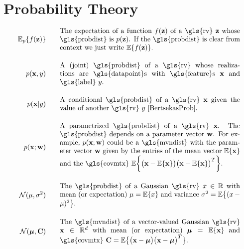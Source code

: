 \section*{Probability Theory} 
\begin{align}
	\expect_{p} \{ f(\datapoint) \}  \quad\quad & \parbox{.75\textwidth}{The expectation of a function $f(\datapoint)$ of a \gls{rv} 
		$\datapoint$ whose \gls{probdist} is $\prob{\datapoint}$. If the \gls{probdist} is clear from context 
		we just write $\expect \{ f(\datapoint) \}$. }    \nonumber \\[4mm]             
	\prob{\featurevec,\truelabel} \quad\quad & \parbox{.75\textwidth}{A (joint) \gls{probdist} of a \gls{rv} 
		whose realizations are \gls{datapoint}s with \gls{feature}s $\featurevec$ and \gls{label} $\truelabel$.} \nonumber            \\[4mm]             
	\prob{\featurevec|\truelabel} \quad\quad & \parbox{.75\textwidth}{A conditional \gls{probdist} of a \gls{rv} 
		$\featurevec$ given the value of another \gls{rv} $\truelabel$ \cite[Sec.\ 3.5]{BertsekasProb}. } \nonumber        \\[4mm]             
	\prob{\featurevec;\weights} \quad\quad & \parbox{.75\textwidth}{A parametrized \gls{probdist} of a \gls{rv} $\featurevec$. 
		The \gls{probdist} depends on a parameter vector $\weights$. For example, $\prob{\featurevec;\weights}$ could be a 
		\gls{mvndist} with the parameter vector $\weights$ given by the entries of the mean vector $\expect \{ \featurevec \}$ 
		and the \gls{covmtx} $\expect \bigg \{ \big( \featurevec - \expect \{ \featurevec \}\big) \big( \featurevec - \expect \{ \featurevec \}\big)^{T}  \bigg\}$.} \nonumber              \\[4mm]
	\mathcal{N}(\mu, \sigma^{2}) \quad\quad & \parbox{.75\textwidth}{The \gls{probdist} of a Gaussian 
		\gls{rv} $\feature \in \mathbb{R}$ with mean (or expectation) $\mu= \expect \{ \feature \}$ 
		and variance $\sigma^{2} =   \expect \big\{  (  \feature - \mu )^2 \big\}$.} \nonumber       \\[4mm]
	\mathcal{N}(\clustermean, \mathbf{C}) \quad\quad & \parbox{.75\textwidth}{The \gls{mvndist} of a vector-valued 
		 Gaussian \gls{rv} $\featurevec \in \mathbb{R}^{\featuredim}$ with mean (or expectation) $\clustermean= \expect \{ \featurevec \}$ 
		and \gls{covmtx} $\mathbf{C} =  \expect \big\{ \big( \featurevec - \clustermean \big)\big( \featurevec - \clustermean \big)^{T} \big\}$.} \nonumber                                             
\end{align}





